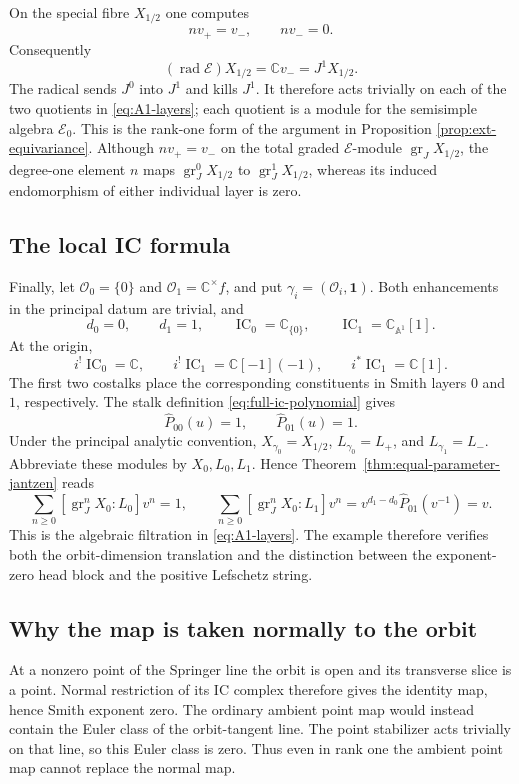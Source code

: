 \documentclass[11pt]{amsart}
\theoremstyle{definition}
\theoremstyle{remark}
\newcommand{\IC}{\operatorname{IC}}
\begin{document}
On the special fibre $X_{1/2}$ one computes
\[
 nv_+=v_-,\qquad nv_-=0.
\]
Consequently
\[
 (\operatorname{rad}\mathcal E)X_{1/2}
 =\mathbb Cv_-=J^1X_{1/2}.
\]
The radical sends $J^0$ into $J^1$ and kills $J^1$.  It therefore acts
trivially on each of the two quotients in
\eqref{eq:A1-layers}; each quotient is a module for the semisimple algebra
$\mathcal E_0$.  This is the rank-one form of the argument in Proposition
\ref{prop:ext-equivariance}.  Although $nv_+=v_-$ on the total graded
$\mathcal E$-module
$\operatorname{gr}_JX_{1/2}$, the degree-one element $n$ maps
$\operatorname{gr}_J^0X_{1/2}$ to $\operatorname{gr}_J^1X_{1/2}$, whereas
its induced endomorphism of either individual layer is zero.

\subsection{The local IC formula}

Finally, let $\mathcal O_0=\{0\}$ and
$\mathcal O_1=\mathbb C^\times f$, and put
$\gamma_i=(\mathcal O_i,\mathbf1)$.  Both enhancements in the principal datum are trivial, and
\[
 d_0=0,\qquad d_1=1,
 \qquad
 \IC_0=\mathbb C_{\{0\}},\qquad
 \IC_1=\mathbb C_{\mathbb A^1}[1].
\]
At the origin,
\[
 i^!\IC_0=\mathbb C,
 \qquad
 i^!\IC_1=\mathbb C[-1](-1),
 \qquad
 i^*\IC_1=\mathbb C[1].
\]
The first two costalks place the corresponding constituents in Smith layers
$0$ and $1$, respectively.  The stalk definition
\eqref{eq:full-ic-polynomial} gives
\[
 \widehat P_{00}(u)=1,
 \qquad
 \widehat P_{01}(u)=1.
\]
Under the principal analytic convention,
$X_{\gamma_0}=X_{1/2}$, $L_{\gamma_0}=L_+$, and
$L_{\gamma_1}=L_-$.  Abbreviate these modules by $X_0,L_0,L_1$.
Hence
Theorem~\ref{thm:equal-parameter-jantzen} reads
\[
 \sum_{n\geq0}[\operatorname{gr}_J^nX_0:L_0]v^n=1,
 \qquad
 \sum_{n\geq0}[\operatorname{gr}_J^nX_0:L_1]v^n
 =v^{d_1-d_0}\widehat P_{01}(v^{-1})=v.
\]
This is the algebraic filtration in
\eqref{eq:A1-layers}.  The example therefore verifies both the
orbit-dimension translation and the distinction between the exponent-zero
head block and the positive Lefschetz string.

\subsection{Why the map is taken normally to the orbit}

At a nonzero point of the Springer line the orbit is open and its
transverse slice is a point.  Normal restriction of its IC complex
therefore gives the identity map, hence Smith exponent zero.
The ordinary ambient point map would instead contain the Euler class
of the orbit-tangent line.  The point stabilizer acts trivially on
that line, so this Euler class is zero.  Thus even in rank one the
ambient point map cannot replace the normal map.
\end{document}
